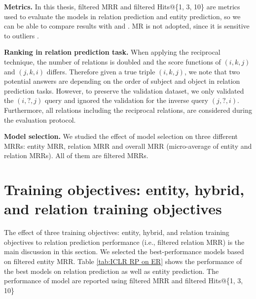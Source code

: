 \noindent\textbf{Metrics.} 
In this thesis, filtered MRR and filtered Hits@\{1, 3, 10\} are metrics used to evaluate the models in relation prediction and entity prediction, so we can be able to compare results with \citet{chen2021relation} and \citet{Ruffinelli2020You}. MR is not adopted, since it is sensitive to outliers \citep{nickel2016holographic}.
\newline

\noindent\textbf{Ranking in relation prediction task.} When applying the reciprocal technique, the number of relations is doubled and the score functions of $(i, k, j)$ and $(j, k, i)$ differs. Therefore given a true triple $(i, k, j)$, we note that two potential answers are depending on the order of subject and object in relation prediction tasks. However, to preserve the validation dataset, we only validated the $(i, ?, j)$ query and ignored the validation for the inverse query $(j, ?, i)$. Furthermore, all relations including the reciprocal relations, are considered during the evaluation protocol. 
\newline

\noindent\textbf{Model selection.} We studied the effect of model selection on three different MRRs: entity MRR, relation MRR and overall MRR (micro-average of entity and relation MRRs). All of them are filtered MRRs. 
\newline




\section[Training objectives]{Training objectives: entity, hybrid, and relation training objectives}
\label{sec:Training objectives}

The effect of three training objectives: entity, hybrid, and relation training objectives to relation prediction performance (i.e., filtered relation MRR) is the main discussion in this section. We selected the best-performance models based on filtered entity MRR. Table \ref{tab:ICLR RP on ER} shows the performance of the best models on relation prediction as well as entity prediction. The performance of model are reported using filtered MRR and filtered Hits@\{1, 3, 10\} 


